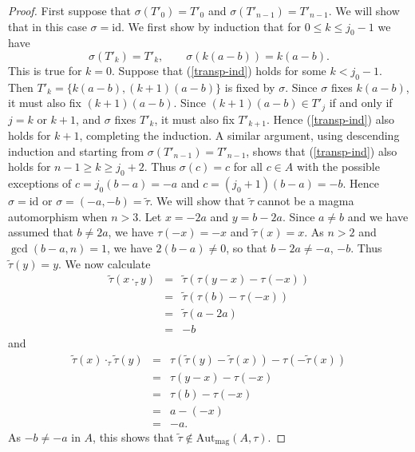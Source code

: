 \documentclass[letterpaper,12pt]{amsart}
\numberwithin{equation}{section}
\numberwithin{algorithm}{section}
\theoremstyle{definition}
\newcommand{\id}{\mathrm{id}}
\newcommand{\Autmag}{\mathrm{Aut}_\mathrm{mag}}
\newcommand{\ttau}{\tilde{\tau}}
\begin{document}
\begin{proof}
First suppose that $\sigma(T'_0)=T'_0$ and $\sigma(T'_{n-1}) = T'_{n-1}$. We will show that in this case $\sigma=\id$.
We first show by induction that for $0 \leq k \leq j_0-1$ we have 
\begin{equation} \label{transp-ind}
	\sigma(T'_k)=T'_k, \qquad \sigma(k(a-b))=k(a-b).
\end{equation}
This is true for $k=0$. Suppose that (\ref{transp-ind}) holds for some $k<j_0-1$. Then $T'_k=\{k(a-b),(k+1)(a-b)\}$ is fixed by $\sigma$. Since $\sigma$ fixes $k(a-b)$, it must also fix $(k+1)(a-b)$. Since $(k+1)(a-b) \in T'_j$ if and only if $j=k$ or $k+1$, and $\sigma$ fixes $T'_k$, it must also fix $T'_{k+1}$. Hence (\ref{transp-ind}) also holds for $k+1$, completing the induction. A similar argument, using descending induction and starting from $\sigma(T'_{n-1})=T'_{n-1}$, shows that (\ref{transp-ind}) also holds for $n-1 \geq k \geq j_0+2$. Thus $\sigma(c)=c$ for all $c \in A$ with the possible exceptions of $c=j_0(b-a)=-a$ and $c=(j_0+1)(b-a)=-b$. Hence $\sigma=\id$ or $\sigma=(-a,-b)=\ttau$. We will show that $\ttau$ cannot be a magma automorphism when $n>3$. Let $x=-2a$ and $y=b-2a$. Since $a \neq b$ and we have assumed that $b \neq 2a$, we have $\tau(-x)=-x$ and $\ttau(x)=x$. As $n>2$ and $\gcd(b-a,n)=1$, we have $2(b-a) \neq 0$, so that $b-2a \neq -a$, $-b$. Thus $\ttau(y)=y$. We now calculate
\begin{eqnarray*}
	 \ttau( x \cdot_\tau y) & = & \ttau(\tau(y-x)-\tau(-x)) \\
	                         & = & \ttau(\tau(b)-\tau(-x)) \\
	                         & = & \ttau(a-2a) \\
	                         & = & -b
\end{eqnarray*}
and
\begin{eqnarray*}
	\ttau(x) \cdot_\tau \ttau(y) & = & \tau( \ttau(y)-\ttau(x)) - \tau( -\ttau(x)) \\ 
								& = & \tau(y-x) - \tau(-x) \\
								& = & \tau(b)-\tau(-x) \\
								& = & a -(-x) \\
								& = & -a.						
\end{eqnarray*}        
As $-b \neq -a$ in $A$, this shows that $\ttau \not \in \Autmag(A,\tau)$.


\end{proof}
\end{document}
